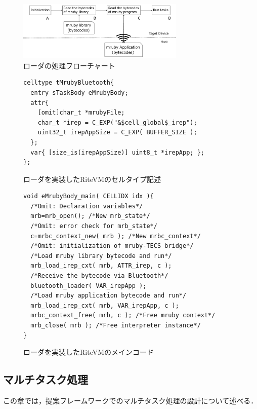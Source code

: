 \documentclass[submit,techrep]{ipsj}
\begin{document}
\begin{figure}[t]
    \centering
    \includegraphics[width=8cm,clip]{../EMSOFT2016/figure/control_flow.pdf}
    \vspace{-2mm}
    \caption{ローダの処理フローチャート}
\vspace{-5mm}
    \label{fig:control_flow}
\end{figure}
\begin{figure}[t]
\centering
\begin{lstlisting}
celltype tMrubyBluetooth{
  entry sTaskBody eMrubyBody;
  attr{
    [omit]char_t *mrubyFile;
    char_t *irep = C_EXP("&$cell_global$_irep");
    uint32_t irepAppSize = C_EXP( BUFFER_SIZE );
  };
  var{ [size_is(irepAppSize)] uint8_t *irepApp; };
};
\end{lstlisting}
    \vspace{-2mm}
\caption{ローダを実装したRiteVMのセルタイプ記述}
\vspace{-4mm}
\label{celltype_mrubybluetooth}
\end{figure}
\begin{figure}[t]
\centering
\begin{lstlisting}
void eMrubyBody_main( CELLIDX idx ){
  /*Omit: Declaration variables*/
  mrb=mrb_open(); /*New mrb_state*/
  /*Omit: error check for mrb_state*/
  c=mrbc_context_new( mrb ); /*New mrbc_context*/
  /*Omit: initialization of mruby-TECS bridge*/
  /*Load mruby library bytecode and run*/
  mrb_load_irep_cxt( mrb, ATTR_irep, c );
  /*Receive the bytecode via Bluetooth*/
  bluetooth_loader( VAR_irepApp );
  /*Load mruby application bytecode and run*/
  mrb_load_irep_cxt( mrb, VAR_irepApp, c );
  mrbc_context_free( mrb, c ); /*Free mruby context*/
  mrb_close( mrb ); /*Free interpreter instance*/
}

\end{lstlisting}
    \vspace{-2mm}
\caption{ローダを実装したRiteVMのメインコード}
\vspace{-3mm}
\label{maincode_mrubybluetooth}
\end{figure} 
\vspace{-5mm}
\subsection{マルチタスク処理}
\label{sec:Multitask}
この章では，提案フレームワークでのマルチタスク処理の設計について述べる．
\end{document}
